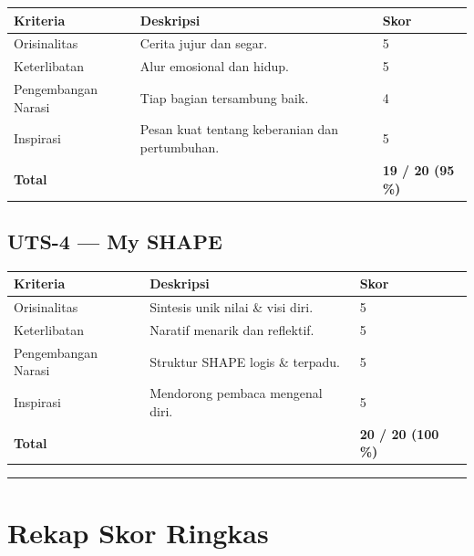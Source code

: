 \documentclass[
  letterpaper,
  DIV=11,
  numbers=noendperiod]{scrreprt}
\begin{document}
\begin{longtable}[]{@{}lll@{}}
\toprule\noalign{}
Kriteria & Deskripsi & Skor \\
\midrule\noalign{}
\endhead
\bottomrule\noalign{}
\endlastfoot
Orisinalitas & Cerita jujur dan segar. & 5 \\
Keterlibatan & Alur emosional dan hidup. & 5 \\
Pengembangan Narasi & Tiap bagian tersambung baik. & 4 \\
Inspirasi & Pesan kuat tentang keberanian dan pertumbuhan. & 5 \\
\textbf{Total} & & \textbf{19 / 20 (95 \%)} \\
\end{longtable}

\subsection{\texorpdfstring{\textbf{UTS-4 --- My
SHAPE}}{UTS-4 --- My SHAPE}}\label{uts-4-my-shape-1}

\begin{longtable}[]{@{}lll@{}}
\toprule\noalign{}
Kriteria & Deskripsi & Skor \\
\midrule\noalign{}
\endhead
\bottomrule\noalign{}
\endlastfoot
Orisinalitas & Sintesis unik nilai \& visi diri. & 5 \\
Keterlibatan & Naratif menarik dan reflektif. & 5 \\
Pengembangan Narasi & Struktur SHAPE logis \& terpadu. & 5 \\
Inspirasi & Mendorong pembaca mengenal diri. & 5 \\
\textbf{Total} & & \textbf{20 / 20 (100 \%)} \\
\end{longtable}

\begin{center}\rule{0.5\linewidth}{0.5pt}\end{center}

\section{\texorpdfstring{\textbf{Rekap Skor
Ringkas}}{Rekap Skor Ringkas}}\label{rekap-skor-ringkas}
\end{document}
